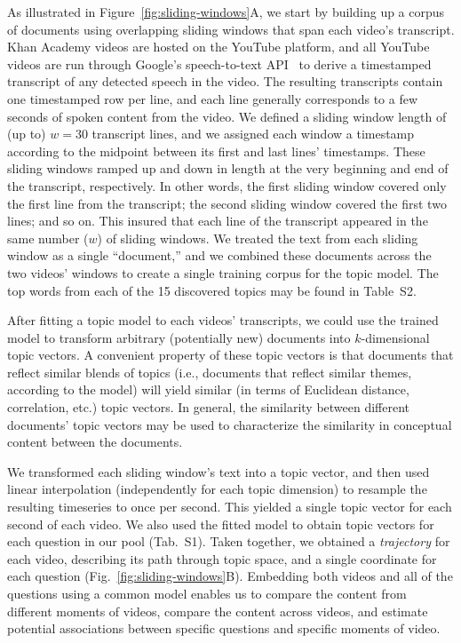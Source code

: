 \documentclass[10pt]{article}
\newcommand{\questions}{S1}
\newcommand{\topics}{S2}
\begin{document}
As illustrated in Figure~\ref{fig:sliding-windows}A, we start by building up a
corpus of documents using overlapping sliding windows that span each video's
transcript. Khan Academy videos are hosted on the YouTube platform, and all
YouTube videos are run through Google's speech-to-text API~\citep{HalpEtal16}
to derive a timestamped transcript of any detected speech in the video. The
resulting transcripts contain one timestamped row per line, and each line
generally corresponds to a few seconds of spoken content from the video. We
defined a sliding window length of (up to) $w = 30$ transcript lines, and we
assigned each window a timestamp according to the midpoint between its first
and last lines' timestamps. These sliding windows ramped up and down in length
at the very beginning and end of the transcript, respectively. In other words,
the first sliding window covered only the first line from the transcript; the
second sliding window covered the first two lines; and so on. This insured that
each line of the transcript appeared in the same number ($w$) of sliding
windows. We treated the text from each sliding window as a single ``document,''
and we combined these documents across the two videos' windows to create a single
training corpus for the topic model.  The top words from each of the 15 discovered
topics may be found in Table~\topics.

After fitting a topic model to each videos' transcripts, we could use the
trained model to transform arbitrary (potentially new) documents into
$k$-dimensional topic vectors. A convenient property of these topic vectors is
that documents that reflect similar blends of topics (i.e., documents that
reflect similar themes, according to the model) will yield similar (in terms of
Euclidean distance, correlation, etc.) topic vectors. In general, the
similarity between different documents' topic vectors may be used to
characterize the similarity in conceptual content between the documents.

We transformed each sliding window's text into a topic vector, and then used
linear interpolation (independently for each topic dimension) to resample the
resulting timeseries to once per second. This yielded a single topic vector for
each second of each video. We also used the fitted model to obtain topic
vectors for each question in our pool (Tab.~\questions). Taken together, we
obtained a \textit{trajectory} for each video, describing its path through
topic space, and a single coordinate for each question
(Fig.~\ref{fig:sliding-windows}B). Embedding both videos and all of the
questions using a common model enables us to compare the content from different
moments of videos, compare the content across videos, and estimate potential
associations between specific questions and specific moments of video.
\end{document}
